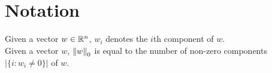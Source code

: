 \section{Notation}

Given a vector $w\in\mathbb{R}^n$, $w_i$ denotes the $i$th component of $w$.\\
Given a vector $w$, $\left\lVert w\right\rVert_0$ is equal to the number of non-zero components $|\{i : w_i \ne 0\}|$ of $w$.